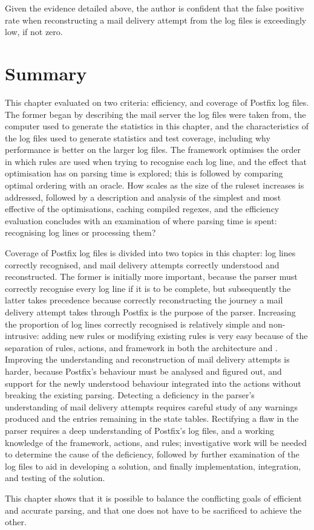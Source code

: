 Given the evidence detailed above, the author is confident that the false
positive rate when reconstructing a mail delivery attempt from the
\numberOFlogFILES{} log files is exceedingly low, if not zero.

\section{Summary}

This chapter evaluated \parsername{} on two criteria: efficiency, and
coverage of Postfix log files.  The former began by describing the mail
server the log files were taken from, the computer used to generate the
statistics in this chapter, and the characteristics of the
\numberOFlogFILES{} log files used to generate statistics and test
coverage, including why performance is better on the larger log files.  The
framework optimises the order in which rules are used when trying to
recognise each log line, and the effect that optimisation has on parsing
time is explored; this is followed by comparing optimal ordering with an
oracle.  How \parsername{} scales as the size of the ruleset increases is
addressed, followed by a description and analysis of the simplest and most
effective of the optimisations, caching compiled regexes, and the
efficiency evaluation concludes with an examination of where parsing time
is spent: recognising log lines or processing them?

Coverage of Postfix log files is divided into two topics in this chapter:
log lines correctly recognised, and mail delivery attempts correctly
understood and reconstructed.  The former is initially more important,
because the parser must correctly recognise every log line if it is to be
complete, but subsequently the latter takes precedence because correctly
reconstructing the journey a mail delivery attempt takes through Postfix is
the purpose of the parser.  Increasing the proportion of log lines
correctly recognised is relatively simple and non-intrusive: adding new
rules or modifying existing rules is very easy because of the separation of
rules, actions, and framework in both the architecture and \parsername{}.
Improving the understanding and reconstruction of mail delivery attempts is
harder, because Postfix's behaviour must be analysed and figured out, and
support for the newly understood behaviour integrated into the actions
without breaking the existing parsing.  Detecting a deficiency in the
parser's understanding of mail delivery attempts requires careful study of
any warnings produced and the entries remaining in the state tables.
Rectifying a flaw in the parser requires a deep understanding of Postfix's
log files, and a working knowledge of the framework, actions, and rules;
investigative work will be needed to determine the cause of the deficiency,
followed by further examination of the log files to aid in developing a
solution, and finally implementation, integration, and testing of the
solution.

This chapter shows that it is possible to balance the conflicting goals of
efficient and accurate parsing, and that one does not have to be sacrificed
to achieve the other.
